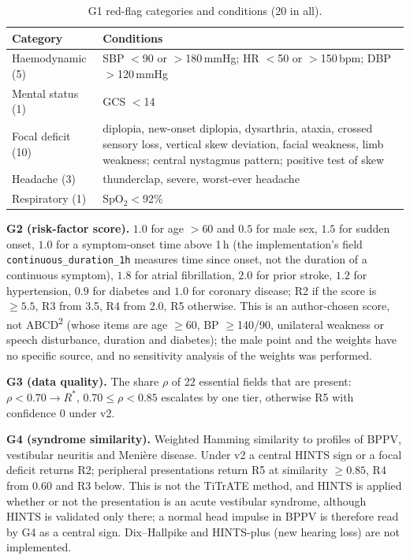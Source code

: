 \documentclass[11pt,a4paper]{article}%
\begin{document}
\begin{table}[h]
\caption{G1 red-flag categories and conditions (20 in all).}\label{tab:g1}
\small
\begin{tabular}{@{}p{}p{}@{}}
\toprule
Category & Conditions \\
\midrule
Haemodynamic (5) & SBP $<$90 or $>$180\,mmHg; HR $<$50 or $>$150\,bpm; DBP $>$120\,mmHg \\
Mental status (1) & GCS $<$14 \\
Focal deficit (10) & diplopia, new-onset diplopia, dysarthria, ataxia, crossed sensory loss, vertical skew deviation, facial weakness, limb weakness; central nystagmus pattern; positive test of skew \\
Headache (3) & thunderclap, severe, worst-ever headache \\
Respiratory (1) & SpO$_2<$92\% \\
\bottomrule
\end{tabular}
\end{table}

\textbf{G2 (risk-factor score).} $1.0$ for age $>60$ and $0.5$ for male sex, $1.5$ for sudden onset, $1.0$ for a symptom-onset time above 1\,h (the implementation's field \texttt{continuous\_duration\_1h} measures time since onset, not the duration of a continuous symptom), $1.8$ for atrial fibrillation, $2.0$ for prior stroke, $1.2$ for hypertension, $0.9$ for diabetes and $1.0$ for coronary disease; R2 if the score is $\ge5.5$, R3 from 3.5, R4 from 2.0, R5 otherwise. This is an author-chosen score, not ABCD\textsuperscript{2} (whose items are age $\ge$60, BP $\ge$140/90, unilateral weakness or speech disturbance, duration and diabetes); the male point and the weights have no specific source, and no sensitivity analysis of the weights was performed.

\textbf{G3 (data quality).} The share $\rho$ of 22 essential fields that are present: $\rho<0.70\to R^*$, $0.70\le\rho<0.85$ escalates by one tier, otherwise R5 with confidence 0 under v2.

\textbf{G4 (syndrome similarity).} Weighted Hamming similarity to profiles of BPPV, vestibular neuritis and Meni\`ere disease. Under v2 a central HINTS sign or a focal deficit returns R2; peripheral presentations return R5 at similarity $\ge0.85$, R4 from 0.60 and R3 below. This is not the TiTrATE method, and HINTS is applied whether or not the presentation is an acute vestibular syndrome, although HINTS is validated only there; a normal head impulse in BPPV is therefore read by G4 as a central sign. Dix--Hallpike and HINTS-plus (new hearing loss) are not implemented.
\end{document}
